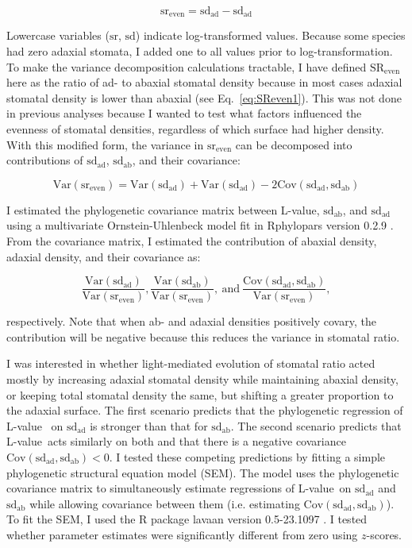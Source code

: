 \documentclass[12pt, oneside]{article}
\newcommand{\pkg}[1]{{\fontseries{b}\selectfont #1}}
\newcommand{\el}{L-value}
\begin{document}
\begin{equation} \label{eq:SReven3} 
  \mathrm{sr_{even}} = \mathrm{sd_{ad}} - \mathrm{sd_{ad}}
\end{equation}

Lowercase variables ($\mathrm{sr}$, $\mathrm{sd}$) indicate log-transformed values. Because some species had zero adaxial stomata, I added one to all values prior to log-transformation. To make the variance decomposition calculations tractable, I have defined $\mathrm{SR_{even}}$ here as the ratio of ad- to abaxial stomatal density because in most cases adaxial stomatal density is lower than abaxial (see Eq.~\ref{eq:SReven1}). This was not done in previous analyses because I wanted to test what factors influenced the evenness of stomatal densities, regardless of which surface had higher density. With this modified form, the variance in $\mathrm{sr_{even}}$ can be decomposed into contributions of $\mathrm{sd_{ad}}$, $\mathrm{sd_{ab}}$, and their covariance:

\begin{equation} \label{eq:varDecomp}
	\mathrm{Var(sr_{even})} = \mathrm{Var(sd_{ad})} + \mathrm{Var(sd_{ad})} - 2 \mathrm{Cov(sd_{ad}, sd_{ab})}
\end{equation}

I estimated the phylogenetic covariance matrix between \el, $\mathrm{sd_{ab}}$, and $\mathrm{sd_{ad}}$ using a multivariate Ornstein-Uhlenbeck model fit in \pkg{Rphylopars} version 0.2.9 \citep{Goolsby_etal_2016, Goolsby_etal_2017}. From the covariance matrix, I estimated the contribution of abaxial density, adaxial density, and their covariance as:

\begin{equation} \label{eq:contribution}
	\frac{\mathrm{Var(sd_{ad})}}{\mathrm{Var(sr_{even})}}, \frac{\mathrm{Var(sd_{ab})}}{\mathrm{Var(sr_{even})}},~\textrm{and}~\frac{\mathrm{Cov(sd_{ad}, sd_{ab})}}{\mathrm{Var(sr_{even})}},
\end{equation}

respectively. Note that when ab- and adaxial densities positively covary, the contribution will be negative because this reduces the variance in stomatal ratio.

I was interested in whether light-mediated evolution of stomatal ratio acted mostly by increasing adaxial stomatal density while maintaining abaxial density, or keeping total stomatal density the same, but shifting a greater proportion to the adaxial surface. The first scenario predicts that the phylogenetic regression of \el~ on $\mathrm{sd_{ad}}$ is stronger than that for $\mathrm{sd_{ab}}$. The second scenario predicts that \el~acts similarly on both and that there is a negative covariance $\mathrm{Cov(sd_{ad}, sd_{ab}) < 0}$. I tested these competing predictions by fitting a simple phylogenetic structural equation model (SEM). The model uses the phylogenetic covariance matrix to simultaneously estimate regressions of \el~on $\mathrm{sd_{ad}}$ and $\mathrm{sd_{ab}}$ while allowing covariance between them (i.e. estimating $\mathrm{Cov(sd_{ad}, sd_{ab})}$). To fit the SEM, I used the R package \pkg{lavaan} version 0.5-23.1097 \citep{Rosseel_2012}. I tested whether parameter estimates were significantly different from zero using $z$-scores.
\end{document}
